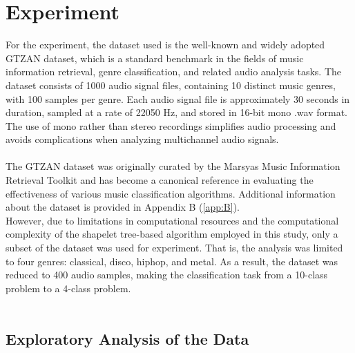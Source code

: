 \chapter{Experiment}
For the experiment, the dataset used is the well-known and widely adopted GTZAN dataset, which is a standard benchmark in the fields of music information retrieval, genre classification, and related audio analysis tasks. The dataset consists of 1000 audio signal files, containing 10 distinct music genres, with 100 samples per genre. Each audio signal file is approximately 30 seconds in duration, sampled at a rate of 22050 Hz, and stored in 16-bit mono .wav format. The use of mono rather than stereo recordings simplifies audio processing and avoids complications when analyzing multichannel audio signals.\\
\\
The GTZAN dataset was originally curated by the Marsyas Music Information Retrieval Toolkit and has become a canonical reference in evaluating the effectiveness of various music classification algorithms. Additional information about the dataset is provided in Appendix B (\ref{app:B}).
\\
However, due to limitations in computational resources and the computational complexity of the shapelet tree-based algorithm employed in this study, only a subset of the dataset was used for experiment. That is, the analysis was limited to four genres: classical, disco, hiphop, and metal. As a result, the dataset was reduced to 400 audio samples, making the classification task from a 10-class problem to a 4-class problem. \\
\\
\section{Exploratory Analysis of the Data}
